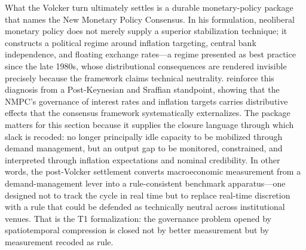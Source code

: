 \documentclass[11pt,a4paper]{article}
\begin{document}

What the Volcker turn ultimately settles is a durable monetary-policy package that
\citet{SaadFilho2018} names the New Monetary Policy Consensus. In his
formulation, neoliberal monetary policy does not merely supply a superior
stabilization technique; it constructs a political regime around inflation
targeting, central bank independence, and floating exchange rates---a regime
presented as best practice since the late 1980s, whose distributional consequences
are rendered invisible precisely because the framework claims technical
neutrality. \citet{LofaroMatamorosRochon2025} reinforce this diagnosis from a Post-Keynesian
and Sraffian standpoint, showing that the NMPC's governance of interest rates and
inflation targets carries distributive effects that the consensus framework
systematically externalizes. The package matters for this section because it
supplies the closure language through which slack is recoded: no longer
principally idle capacity to be mobilized through demand management, but an output
gap to be monitored, constrained, and interpreted through inflation expectations
and nominal credibility. In other words, the post-Volcker settlement converts
macroeconomic measurement from a demand-management lever into a rule-consistent
benchmark apparatus---one designed not to track the cycle in real time but to
replace real-time discretion with a rule that could be defended as technically
neutral across institutional venues. That is the T1 formalization: the governance
problem opened by spatiotemporal compression is closed not by better measurement
but by measurement recoded as rule.


\end{document}
